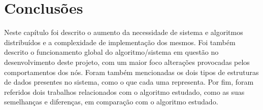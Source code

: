 \section{Conclusões}
\label{motivacao:sec:conclusao}
Neste capítulo foi descrito o aumento da necessidade de sistema e algoritmos distribuídos e a complexidade de implementação dos mesmos. Foi também descrito o funcionamento global do algoritmo/sistema em questão no desenvolvimento deste projeto, com um maior foco alterações provocadas pelos comportamentos dos nós. Foram também mencionadas os dois tipos de estruturas de dados presentes no sistema, como o que cada uma representa. Por fim, foram referidos dois trabalhos relacionados com o algoritmo estudado, como as suas semelhanças e diferenças, em comparação com o algoritmo estudado.

